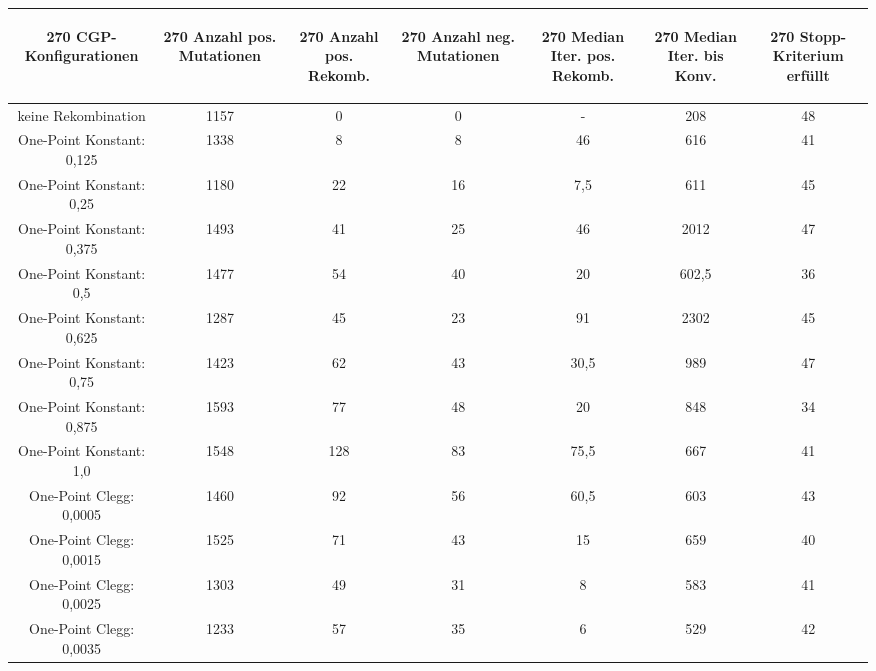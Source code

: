 \begin{table}[H]
	\centering
	\begin{tabular}{c | c | c | c | c | c | c}
		\begin{turn}{270} \textbf{CGP-Konfigurationen} \end{turn} & \begin{turn}{270} \textbf{Anzahl pos. Mutationen} \end{turn} & \begin{turn}{270} \textbf{Anzahl pos. Rekomb.} \end{turn} & \begin{turn}{270} \textbf{Anzahl neg. Mutationen} \end{turn} & \begin{turn}{270} \textbf{Median Iter. pos. Rekomb.} \end{turn} & \begin{turn}{270} \textbf{Median Iter. bis Konv.} \end{turn} & \begin{turn}{270} \textbf{Stopp-Kriterium erfüllt} \end{turn}\\
		\hline
		keine Rekombination & 1157 & 0 & 0 & - & 208 & 48\\
		\hline
		One-Point Konstant: 0,125 & 1338 & 8 & 8 & 46 & 616 & 41\\
		\hline
		One-Point Konstant: 0,25 & 1180 & 22 & 16 & 7,5 & 611 & 45\\
		\hline
		One-Point Konstant: 0,375 & 1493 & 41 & 25 & 46 & 2012 & 47\\
		\hline
		One-Point Konstant: 0,5 & 1477 & 54 & 40 & 20 & 602,5 & 36\\
		\hline
		One-Point Konstant: 0,625 & 1287 & 45 & 23 & 91 & 2302 & 45\\
		\hline
		One-Point Konstant: 0,75 & 1423 & 62 & 43 & 30,5 & 989 & 47\\
		\hline
		One-Point Konstant: 0,875 & 1593 & 77 & 48 & 20 & 848 & 34\\
		\hline
		One-Point Konstant: 1,0 & 1548 & 128 & 83 & 75,5 & 667 & 41\\
		\hline
		One-Point Clegg: 0,0005 & 1460 & 92 & 56 & 60,5 & 603 & 43\\
		\hline
		One-Point Clegg: 0,0015 & 1525 & 71 & 43 & 15 & 659 & 40\\
		\hline
		One-Point Clegg: 0,0025 & 1303 & 49 & 31 & 8 & 583 & 41\\
		\hline
		One-Point Clegg: 0,0035 & 1233 & 57 & 35 & 6 & 529 & 42\\

\end{tabular}
\end{table}
